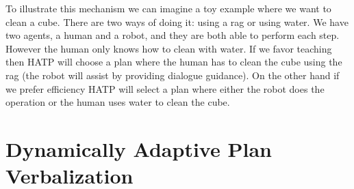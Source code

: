 \documentclass{llncs}
\begin{document}

To illustrate this mechanism we can imagine a toy example where we want to clean a cube. There are two ways of doing it: using a rag or using water. We have two agents, a human and a robot, and they are both able to perform each step. However the human only knows how to clean with water. If we favor teaching then HATP will choose a plan where the human has to clean the cube using the rag (the robot will assist by providing dialogue guidance). On the other hand if we prefer efficiency HATP will select a plan where either the robot does the operation or the human uses water to clean the cube. 



\section{Dynamically Adaptive Plan Verbalization}
\label{planVerbalization}

\end{document}

